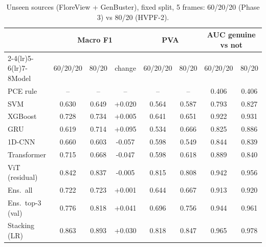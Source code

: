 \documentclass[11pt,a4paper]{article}
\begin{document}
\begin{table}[H]\centering\small\caption{Unseen sources (FloreView + GenBuster), fixed split, 5 frames: 60/20/20 (Phase 3) vs 80/20 (HVPF-2).}\begin{tabular}{lccccccc}\toprule & \multicolumn{3}{c}{Macro F1} & \multicolumn{2}{c}{PVA} & \multicolumn{2}{c}{AUC genuine vs not} \\\cmidrule(lr){2-4}\cmidrule(lr){5-6}\cmidrule(lr){7-8}Model & 60/20/20 & 80/20 & change & 60/20/20 & 80/20 & 60/20/20 & 80/20 \\\midrule
PCE rule & -- & -- & -- & -- & -- & 0.406 & 0.406 \\
SVM & 0.630 & 0.649 & +0.020 & 0.564 & 0.587 & 0.793 & 0.827 \\
XGBoost & 0.728 & 0.734 & +0.005 & 0.641 & 0.651 & 0.922 & 0.931 \\
GRU & 0.619 & 0.714 & +0.095 & 0.534 & 0.666 & 0.825 & 0.886 \\
1D-CNN & 0.660 & 0.603 & -0.057 & 0.598 & 0.549 & 0.844 & 0.839 \\
Transformer & 0.715 & 0.668 & -0.047 & 0.598 & 0.618 & 0.889 & 0.840 \\
ViT (residual) & 0.842 & 0.837 & -0.005 & 0.815 & 0.808 & 0.942 & 0.956 \\
Ens.\ all & 0.722 & 0.723 & +0.001 & 0.644 & 0.667 & 0.913 & 0.920 \\
Ens.\ top-3 (val) & 0.776 & 0.818 & +0.041 & 0.696 & 0.756 & 0.944 & 0.961 \\
Stacking (LR) & 0.863 & 0.893 & +0.030 & 0.818 & 0.847 & 0.965 & 0.978 \\
\bottomrule\end{tabular}\end{table}
\end{document}
